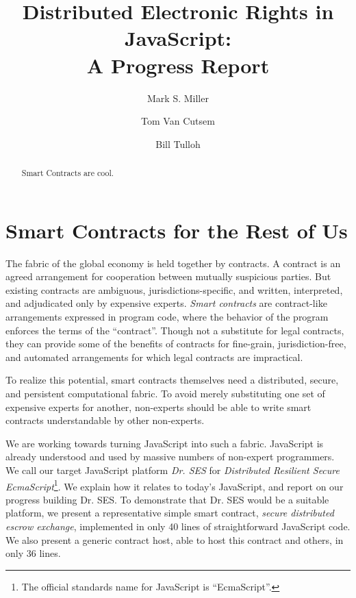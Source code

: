 \documentclass{llncs}
\begin{document}
\title{Distributed Electronic Rights in JavaScript:\\
A Progress Report}

\author{Mark S. Miller \and Tom Van Cutsem \and Bill Tulloh }


\maketitle    

\begin{abstract}

Smart Contracts are cool.

\end{abstract}

\section{Smart Contracts for the Rest of Us}

The fabric of the global economy is held together by contracts. A contract is an agreed arrangement for cooperation between mutually suspicious parties. But existing contracts are ambiguous, jurisdictions-specific, and written, interpreted, and adjudicated only by expensive experts. \emph{Smart contracts} are contract-like arrangements expressed in program code, where the behavior of the program enforces the terms of the ``contract''\cite{szabo1997formalizing}. Though not a substitute for legal contracts, they can provide some of the benefits of contracts for fine-grain, jurisdiction-free, and automated arrangements for which legal contracts are impractical.

To realize this potential, smart contracts themselves need a distributed, secure, and persistent computational fabric. To avoid merely substituting one set of expensive experts for another, non-experts should be able to write smart contracts understandable by other non-experts.

We are working towards turning JavaScript into such a fabric. JavaScript is already understood and used by massive numbers of non-expert programmers. We call our target JavaScript platform \emph{Dr. SES} for \emph{Distributed Resilient Secure EcmaScript}\footnote{The official standards name for JavaScript is ``EcmaScript''.}. We explain how it relates to today's JavaScript, and report on our progress building Dr. SES. To demonstrate that Dr. SES would be a suitable platform, we present a representative simple smart contract, \emph{secure distributed escrow exchange}, implemented in only 40 lines of straightforward JavaScript code. We also present a generic contract host, able to host this contract and others, in only 36 lines.
\end{document}

